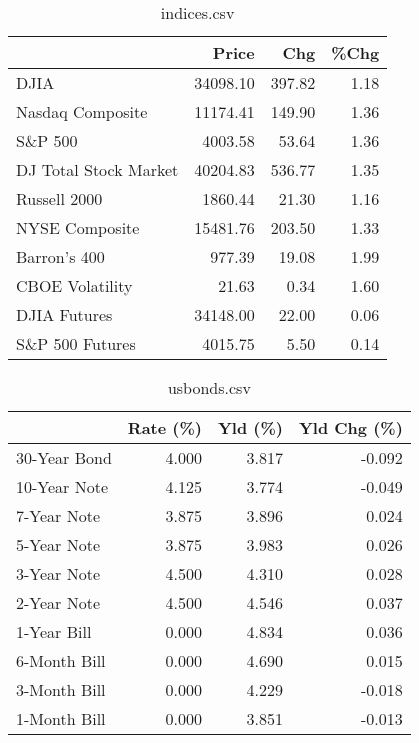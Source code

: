 \documentclass{article}%
\begin{document}
%


\begin{table}[htbp]%
\caption{indices.csv}%
\centering%
\begin{adjustbox}{width=1\textwidth}%
\begin{tabular}{lrrr}
\toprule
                      &    Price &    Chg &  \%Chg \\
\midrule
                 DJIA & 34098.10 & 397.82 &  1.18 \\
     Nasdaq Composite & 11174.41 & 149.90 &  1.36 \\
              S\&P 500 &  4003.58 &  53.64 &  1.36 \\
DJ Total Stock Market & 40204.83 & 536.77 &  1.35 \\
         Russell 2000 &  1860.44 &  21.30 &  1.16 \\
       NYSE Composite & 15481.76 & 203.50 &  1.33 \\
         Barron's 400 &   977.39 &  19.08 &  1.99 \\
      CBOE Volatility &    21.63 &   0.34 &  1.60 \\
         DJIA Futures & 34148.00 &  22.00 &  0.06 \\
      S\&P 500 Futures &  4015.75 &   5.50 &  0.14 \\
\bottomrule
\end{tabular}
%
\end{adjustbox}%
\end{table}

%


\begin{table}[htbp]%
\caption{usbonds.csv}%
\centering%
\begin{adjustbox}{width=1\textwidth}%
\begin{tabular}{lrrr}
\toprule
             &  Rate (\%) &  Yld (\%) &  Yld Chg (\%) \\
\midrule
30-Year Bond &     4.000 &    3.817 &       -0.092 \\
10-Year Note &     4.125 &    3.774 &       -0.049 \\
 7-Year Note &     3.875 &    3.896 &        0.024 \\
 5-Year Note &     3.875 &    3.983 &        0.026 \\
 3-Year Note &     4.500 &    4.310 &        0.028 \\
 2-Year Note &     4.500 &    4.546 &        0.037 \\
 1-Year Bill &     0.000 &    4.834 &        0.036 \\
6-Month Bill &     0.000 &    4.690 &        0.015 \\
3-Month Bill &     0.000 &    4.229 &       -0.018 \\
1-Month Bill &     0.000 &    3.851 &       -0.013 \\
\bottomrule
\end{tabular}
%
\end{adjustbox}%
\end{table}
\end{document}
